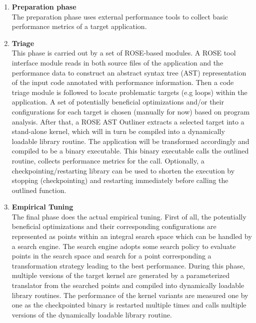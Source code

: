 \begin{enumerate}
   \item {\bf Preparation phase} \\ 
      The preparation phase uses external performance tools to collect basic performance
      metrics of a target application. 

   \item {\bf Triage} \\
      This phase is carried out by a set of ROSE-based modules. A ROSE tool interface
      module reads in both source files of the application and the performance data to
      construct an abstract syntax tree (AST) representation of the input code annotated
      with performance information. 
      Then a code triage module is followed to locate problematic targets (e.g
      loops) within the application. A set of potentially beneficial
      optimizations and/or their configurations for each target is chosen
      (manually for now) based on program analysis. 
      After that, a ROSE AST Outliner extracts a selected target into
      a stand-alone kernel, which will in turn be compiled into a dynamically loadable library routine. 
      The application will be transformed accordingly and compiled to be a binary executable.
      This binary executable calls the outlined routine, collects performance metrics for
      the call.
      Optionally, a checkpointing/restarting library can be used to shorten
      the execution by stopping (checkpointing) and
      restarting immediately before calling the outlined function.

   \item {\bf Empirical Tuning} \\
      The final phase does the actual empirical tuning. First of all, the
      potentially beneficial optimizations and their corresponding configurations
      are represented as points within an integral search space which can be handled by a search engine. 
      The search engine adopts some search policy to evaluate points in the search space
      and search for a point corresponding a transformation strategy leading to the best
      performance. 
      During this phase, multiple versions of the target kernel are generated by
      a parameterized translator%
      from the searched points and compiled into dynamically loadable library
      routines. The performance of the kernel variants are measured one by one as the
      checkpointed binary is restarted multiple times and calls multiple versions
      of the dynamically loadable library routine. 
\end{enumerate}

